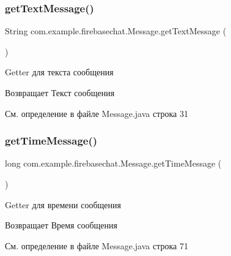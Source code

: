 \subsubsection{\texorpdfstring{get\+Text\+Message()}{getTextMessage()}}
{\footnotesize\ttfamily String com.\+example.\+firebasechat.\+Message.\+get\+Text\+Message (\begin{DoxyParamCaption}{ }\end{DoxyParamCaption})}

Getter для текста сообщения \begin{DoxyReturn}{Возвращает}
Текст сообщения 
\end{DoxyReturn}


См. определение в файле Message.\+java строка 31

\mbox{\label{classcom_1_1example_1_1firebasechat_1_1_message_a3c210d1ca7c8582e702aff4c1e6fdd47}} 
\subsubsection{\texorpdfstring{get\+Time\+Message()}{getTimeMessage()}}
{\footnotesize\ttfamily long com.\+example.\+firebasechat.\+Message.\+get\+Time\+Message (\begin{DoxyParamCaption}{ }\end{DoxyParamCaption})}



Getter для времени сообщения 

\begin{DoxyReturn}{Возвращает}
Время сообщения 
\end{DoxyReturn}


См. определение в файле Message.\+java строка 71

\mbox{\label{classcom_1_1example_1_1firebasechat_1_1_message_a3616de6e6cf9ddcfee8b09ac520133e4}} 
